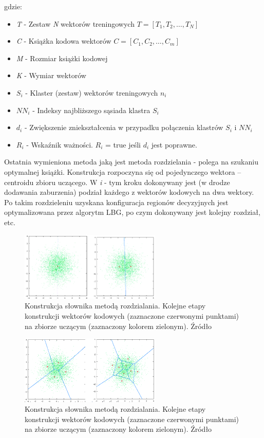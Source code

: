\documentclass{article}
\begin{document}
gdzie:
\begin{itemize}[label=]
    \item \textit{T} - Zestaw \textit{N} wektorów treningowych $T = {[T_{1}, T_{2}, \dots, T_{N}]}$
    \item \textit{C} - Książka kodowa wektorów $C = {[C_{1}, C_{2}, \dots, C_{m}]}$
    \item \textit{M} - Rozmiar książki kodowej
    \item \textit{K} - Wymiar wektorów
    \item \textit{$S_{i}$} - Klaster (zestaw) wektorów treningowych $n_{i}$
    \item \textit{$NN_{i}$} - Indeksy najbliższego sąsiada klastra $S_{i}$
    \item \textit{$d_{i}$} - Zwiększenie zniekształcenia w przypadku połączenia klastrów $S_{i}$ i $NN_{i}$
    \item \textit{$R_{i}$} - Wskaźnik ważności. $R_{i}$ = true jeśli $d_{i}$ jest poprawne.
    \cite{tkaukoranta} 
\end{itemize}

Ostatnia wymieniona metoda jaką jest metoda rozdzielania - polega na szukaniu optymalnej książki. Konstrukcja rozpoczyna się od pojedynczego wektora – centroidu zbioru uczącego. W \textit{i} - tym kroku dokonywany jest (w drodze dodawania zaburzenia) podział każdego z wektorów kodowych na dwa wektory. Po takim rozdzieleniu uzyskana konfiguracja regionów decyzyjnych jest optymalizowana przez algorytm LBG, po czym dokonywany jest kolejny rozdział, etc.

\begin{figure}[H]
    \centering
    \includegraphics[width=0.6\textwidth]{images/rodzielania_1.png}
    \caption{Konstrukcja słownika metodą rozdzialania. Kolejne etapy konstrukcji wektorów kodowych (zaznaczone czerwonymi punktami) na zbiorze uczącym (zaznaczony kolorem zielonym).  Źródło \cite{mwilczewski}}
    \label{fig:crossing}
\end{figure}

\begin{figure}[H]
    \centering
    \includegraphics[width=0.6\textwidth]{images/rodzielania_2.png}
    \caption{Konstrukcja słownika metodą rozdzialania. Kolejne etapy konstrukcji wektorów kodowych (zaznaczone czerwonymi punktami) na zbiorze uczącym (zaznaczony kolorem zielonym).  Źródło \cite{mwilczewski}}
    \label{fig:crossing}
\end{figure}
\end{document}
